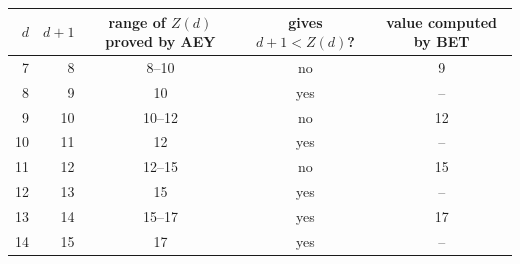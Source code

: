 \begin{tabular}{rrccc}
\toprule
$d$ & $d+1$ & range of $Z(d)$ proved by AEY & gives $d+1<Z(d)$? & value computed by BET \\
\midrule
7 & 8 & 8--10 & no & 9 \\
8 & 9 & 10 & yes & -- \\
9 & 10 & 10--12 & no & 12 \\
10 & 11 & 12 & yes & -- \\
11 & 12 & 12--15 & no & 15 \\
12 & 13 & 15 & yes & -- \\
13 & 14 & 15--17 & yes & 17 \\
14 & 15 & 17 & yes & -- \\
\bottomrule
\end{tabular}
